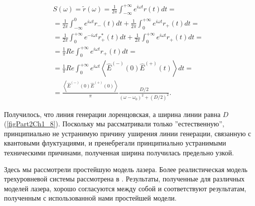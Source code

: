 \begin{eqnarray}
S\left(\omega\right) = \tilde{r}\left(\omega\right) = 
\frac{1}{2\pi}
\int_{-\infty}^{+\infty}e^{i \omega t} r\left(t\right) dt =
\nonumber \\
=
\frac{1}{2\pi}
\int_{-\infty}^0e^{i \omega t} r_{-}\left(t\right) dt +
\frac{1}{2\pi}
\int_0^{+\infty}e^{i \omega t} r_{+}\left(t\right) dt = 
\nonumber \\
=
\frac{1}{2\pi}
\int_0^{+\infty}e^{- i \omega t} r_{+}^{*}\left(t\right) dt +
\frac{1}{2\pi}
\int_0^{+\infty}e^{i \omega t} r_{+}\left(t\right) dt = 
\nonumber \\
=
\frac{1}{\pi} Re
\int_0^{+\infty}e^{i \omega t} r_{+}\left(t\right) dt = 
\nonumber \\
= \frac{1}{\pi}Re
\int_0^{+\infty}e^{i \omega t}
\left<\hat{E}^{(-)}\left(0\right)\hat{E}^{(+)}\left(t\right)\right> dt
=
\nonumber \\
=
\frac{\left<\hat{E}^{(-)}\left(0\right)\hat{E}^{(+)}\left(0\right)\right>}{\pi}
\frac{D/2}{\left(\omega - \omega_0\right)^2 + \left(D/2\right)^2}. 
\label{eqCh3_22}
\end{eqnarray}




Получилось, что линия генерации лоренцовская, а ширина линии равна $D$ 
(\autoref{figPart2Ch1_8}). Поскольку мы рассматривали только ''естественную'',
принципиально не устранимую причину уширения линии генерации,
связанную с квантовыми флуктуациями, и пренебрегали принципиально
устранимыми техническими причинами, полученная ширина получилась
предельно узкой.  

Здесь мы рассмотрели простейшую модель лазера. Более
реалистическая модель трехуровневой системы рассмотрена в
\cite{bHaken1988}. Результаты, полученные для различных моделей
лазера, хорошо согласуются между собой и соответствуют результатам, 
полученным с использованной нами простейшей модели. 
